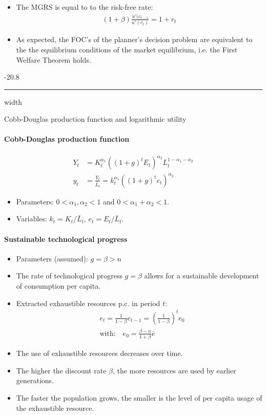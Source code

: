 \documentclass[a4paper,landscape,7pt,fleqn]{scrartcl}
\makeatletter
\renewcommand{\subsubsection}{\@startsection{subsubsection}{1}{0mm}%
{-2\baselineskip}{0.8\baselineskip}%
{\hrule depth 0.2pt width\columnwidth\vspace*{1.2em}\normalsize\bfseries}}
\makeatother
\begin{document}
\begin{multicols*}{3}
\begin{itemize}
\item The MGRS is equal to to the risk-free rate:
\begin{align*}
(1+\beta) \frac{u'(c_{t-1}}{u'(c_t)} = 1 + r_t
\end{align*}
\item As expected, the FOC's of the planner's decision problem are equivalent to the the equilibrium conditions of the market equilibrium, i.e. the First Welfare Theorem holds.
\end{itemize}

\subsubsection{Cobb-Douglas production function and logarithmic utility}

\paragraph{Cobb-Douglas production function}

\begin{align*}
Y_t &= K_t^{\alpha_1}((1+g)^t E_t)^{\alpha_2} L_t^{1-\alpha_1-\alpha_2} \\
y_t &= \frac{Y_t}{\bar L_t} = k_t^{\alpha_1}((1+g)^t e_t)^{\alpha_2}
\end{align*}

\begin{itemize}
\item Parameters: $0<\alpha_1,\alpha_2<1$ and $0<\alpha_1+\alpha_2<1$.
\item Variables: $k_t = K_t / \bar L_t$, $e_t = E_t / \bar L_t$.
\end{itemize}

\paragraph{Sustainable technological progress}

\begin{itemize}
\item Parameters (assumed): $g = \beta > n$
\item The rate of technological progress $g = \beta$ allows for a sustainable development of consumption per capita.
\item Extracted exhaustible resources p.c. in period $t$:
\begin{align*}
& e_t = \frac{1}{1-\beta} e_{t-1} = \left( \frac{1}{1-\beta} \right)^t e_0 \\
& \text{with:} \quad e_0 = \frac{\beta-n}{1+\beta} \bar e
\end{align*}
\item The use of exhaustible resources decreases over time.
\item The higher the discount rate $\beta$, the more resources are used by earlier generations.
\item The faster the population grows, the smaller is the level of per capita usage of the exhaustible resource.
\end{itemize}


\end{multicols*}
\end{document}

